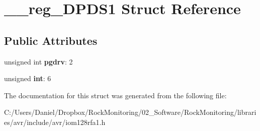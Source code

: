 \hypertarget{struct____reg___d_p_d_s1}{}\section{\+\_\+\+\_\+reg\+\_\+\+D\+P\+D\+S1 Struct Reference}
\label{struct____reg___d_p_d_s1}
\subsection*{Public Attributes}
\begin{DoxyCompactItemize}
\item 
unsigned int {\bfseries pgdrv}\+: 2\hypertarget{struct____reg___d_p_d_s1_a8fabdc856aef2f5e583740c0200698c3}{}\label{struct____reg___d_p_d_s1_a8fabdc856aef2f5e583740c0200698c3}

\item 
unsigned {\bfseries int}\+: 6\hypertarget{struct____reg___d_p_d_s1_ad39167667f679c4b11780e7a5f2d9cea}{}\label{struct____reg___d_p_d_s1_ad39167667f679c4b11780e7a5f2d9cea}

\end{DoxyCompactItemize}


The documentation for this struct was generated from the following file\+:\begin{DoxyCompactItemize}
\item 
C\+:/\+Users/\+Daniel/\+Dropbox/\+Rock\+Monitoring/02\+\_\+\+Software/\+Rock\+Monitoring/libraries/avr/include/avr/iom128rfa1.\+h\end{DoxyCompactItemize}
